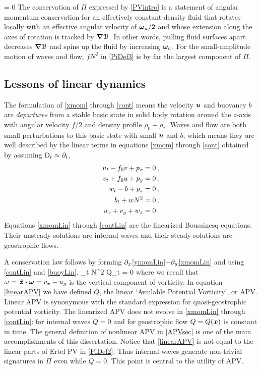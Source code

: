 \documentclass[12pt, oneside]{book}
\begin{document}
 \beq
\Dt{\Pi} = 0   \per
\label{PVintro}
\eeq
The conservation of $\Pi$ expressed by \eqref{PVintro} is a statement of angular momentum conservation for an effectively constant-density fluid that rotates locally with an effective angular velocity of $\boldsymbol \omega_a/2$ and whose extension along the axes of rotation is tracked by $\boldsymbol \nabla  \mathcal{B}$.  In other words, pulling fluid surfaces apart decreases $\boldsymbol \nabla  \mathcal{B}$ and spins up the fluid by increasing $\boldsymbol \omega_a$.  For the small-amplitude motion of waves and flow, $f N^2$ in \eqref{PiDef3} is by far the largest component of $\Pi$.

\subsection{Lessons of linear dynamics}
\label{linearLessons}

The formulation of \eqref{xmom} through \eqref{cont} means the velocity $\boldsymbol u$ and buoyancy $b$ are \textit{departures} from a stable basic state in solid body rotation around the $z$-axis with angular velocity $f/2$ and density profile $\rho_0 + \rho_*$.  Waves and flow are both small perturbations to this basic state with small $\boldsymbol u$ and $b$, which means they are well described by the linear terms in equations \eqref{xmom} through \eqref{cont} obtained by assuming $\mathrm{D}_t \approx \partial_t$,
\begin{align}
u_t - f_0 v + p_x &= 0 \, , \label{xmomLin} \\
v_t + f_0 u + p_y &= 0 \, , \label{ymomLin} \\
w_t - b + p_z &= 0 \, , \label{zmomLin} \\
b_t + w N^2 &= 0 \, , \label{buoyLin} \\
u_x + v_y + w_z &= 0 \label{contLin} \, .
\end{align}
Equations \eqref{xmomLin} through \eqref{contLin} are the linearized Boussinesq equations.  Their unsteady solutions are internal waves and their steady solutions are geostrophic flows. 

A conservation law follows by forming $\partial_x$\eqref{ymomLin}$- \partial_y$\eqref{xmomLin} and using \eqref{contLin} and \eqref{buoyLin}, 
\beq
\p_t   N^2 Q_t = 0 \com
\label{linearAPV}
\eeq
where we recall that $\omega = \hspace{0.1em}\boldsymbol{\hat z} \boldsymbol \cdot \boldsymbol \omega = v_x - u_y$ is the vertical component of vorticity.  In equation \eqref{linearAPV} we have defined $Q$, the linear `Available Potential Vorticity', or APV.  Linear APV is synonymous with the standard expression for quasi-geostrophic potential vorticity.  The linearized APV does not evolve in \eqref{xmomLin} through \eqref{contLin}: for internal waves $Q=0$ and for geostrophic flow $Q = Q(\boldsymbol x)$ is constant in time.  The general definition of nonlinear APV in \ch \ref{APVsec} is one of the main accomplishments of this dissertation.  Notice that \eqref{linearAPV} is not equal to the linear parts of Ertel PV in \eqref{PiDef2}.  Thus internal waves generate non-trivial signatures in $\Pi$ even while $Q=0$.  This point is central to the utility of APV.
\end{document}

